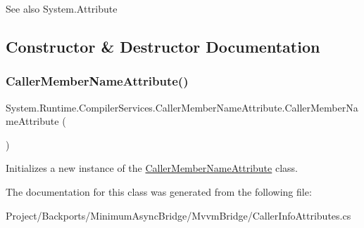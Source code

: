 \begin{DoxySeeAlso}{See also}
System.\+Attribute


\end{DoxySeeAlso}


\subsection{Constructor \& Destructor Documentation}
\mbox{\label{class_system_1_1_runtime_1_1_compiler_services_1_1_caller_member_name_attribute_acaf49a58a4905a9b8135b96ae80cab0c}} 
\subsubsection{\texorpdfstring{Caller\+Member\+Name\+Attribute()}{CallerMemberNameAttribute()}}
{\footnotesize\ttfamily System.\+Runtime.\+Compiler\+Services.\+Caller\+Member\+Name\+Attribute.\+Caller\+Member\+Name\+Attribute (\begin{DoxyParamCaption}{ }\end{DoxyParamCaption})\hspace{0.3cm}{\ttfamily [inline]}}



Initializes a new instance of the \hyperlink{class_system_1_1_runtime_1_1_compiler_services_1_1_caller_member_name_attribute}{Caller\+Member\+Name\+Attribute} class. 



The documentation for this class was generated from the following file\+:\begin{DoxyCompactItemize}
\item 
Project/\+Backports/\+Minimum\+Async\+Bridge/\+Mvvm\+Bridge/Caller\+Info\+Attributes.\+cs\end{DoxyCompactItemize}
